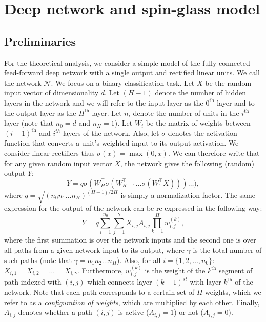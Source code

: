 \documentclass[twoside]{article}
\begin{document}
\section{Deep network and spin-glass model}
\label{sec:NNSG}

\subsection{Preliminaries}

For the theoretical analysis, we consider a simple model of the fully-connected feed-forward deep network with a single output and rectified linear units. We call the network $\mathcal{N}$. We focus on a binary classification task. Let $X$ be the random input vector of dimensionality $d$. Let $(H-1)$ denote the number of hidden layers in the network and we will refer to the input layer as the $0^{\text{th}}$ layer and to the output layer as the $H^{\text{th}}$ layer. Let $n_i$ denote the number of units in the $i^{\text{th}}$ layer (note that $n_0 = d$ and $n_H = 1$). Let $W_i$ be the matrix of weights between $(i - 1)^{\text{th}}$ and $i^{th}$ layers of the network. Also, let $\sigma$ denotes the activation function that converts a unit's weighted input to its output activation. We consider linear rectifiers thus $\sigma(x) = \max(0,x)$. We can therefore write that for any given random input vector $X$, the network gives the following (random) output $Y$:
\[Y = q\sigma(W_H^{\top}\sigma(W_{H-1}^{\top}\dots\sigma(W_1^{\top}X)))\dots),
\]
where $q = \sqrt{(n_0n_1...n_H)^{(H-1)/2H}}$ is simply a normalization factor. The same expression for the output of the network can be re-expressed in the following way:
\begin{equation}
Y = q\sum_{i=1}^{n_0}\sum_{j = 1}^\gamma X_{i,j}A_{i,j}\prod_{k = 1}^{H}w_{i,j}^{(k)},
\label{eq:befrein}
\end{equation}
where the first summation is over the network inputs and the second one is over all paths from a given network input to its output, where $\gamma$ is the total number of such paths (note that $\gamma = n_1n_2\dots n_H$). Also, for all $i = \{1,2,\dots,n_0\}$: $X_{i,1} = X_{i,2} = \dots = X_{i,\gamma}$. Furthermore, $w_{i,j}^{(k)}$ is the weight of the $k^{\text{th}}$ segment of path indexed with $(i,j)$ which connects layer $(k-1)^{st}$ with layer $k^{\text{th}}$ of the network. Note that each path corresponds to a certain set of $H$ weights, which we refer to as a \textit{configuration of weights}, which are multiplied by each other. Finally, $A_{i,j}$ denotes whether a path $(i,j)$ is active ($A_{i,j} = 1$) or not ($A_{i,j} = 0$). 
\end{document}
